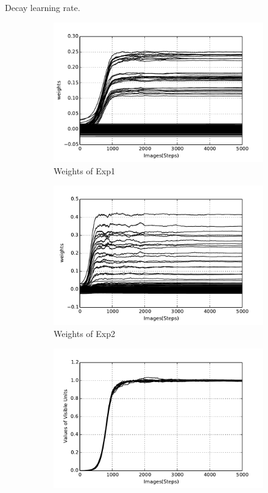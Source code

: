 	Decay learning rate.
	\begin{figure}
		\centering
		\begin{subfigure}[t]{0.4\textwidth}
			\includegraphics[width=\textwidth]{pics_ae/exp1_weights_noisy_decay.pdf}
			\caption{Weights of Exp1}
		\end{subfigure}
		\begin{subfigure}[t]{0.4\textwidth}
			\includegraphics[width=\textwidth]{pics_ae/exp2_weights_noisy_decay.pdf}
			\caption{Weights of Exp2}
		\end{subfigure}
		\begin{subfigure}[t]{0.4\textwidth}
			\includegraphics[width=\textwidth]{pics_ae/exp1_recon_noisy_decay.pdf}

\end{subfigure}
\end{figure}
